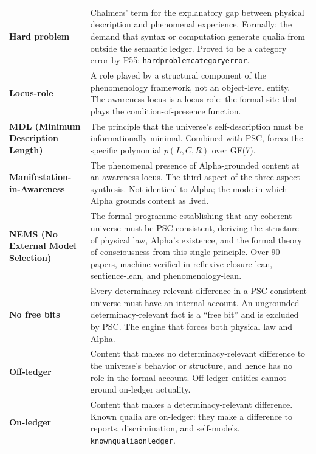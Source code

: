 \documentclass[11pt]{article}
\theoremstyle{remark}
\newcommand{\lean}[1]{%
  \penalty-100
  \begingroup\def\_{\textunderscore\allowbreak}\texttt{#1}\endgroup}
\begin{document}
\begin{longtable}{@{}>{\bfseries}p{}p{}@{}}
Hard problem &
  Chalmers' term for the explanatory gap between physical description and phenomenal
  experience. Formally: the demand that syntax or computation generate qualia from
  outside the semantic ledger. Proved to be a category error by P55:
  \lean{hard\_problem\_category\_error}. \\[4pt]

Locus-role &
  A role played by a structural component of the phenomenology framework, not an
  object-level entity. The awareness-locus is a locus-role: the formal site that plays
  the condition-of-presence function. \\[4pt]

MDL (Minimum Description Length) &
  The principle that the universe's self-description must be informationally minimal.
  Combined with PSC, forces the specific polynomial $p(L,C,R)$ over GF(7). \\[4pt]

Manifestation-in-Awareness &
  The phenomenal presence of Alpha-grounded content at an awareness-locus. The third
  aspect of the three-aspect synthesis. Not identical to Alpha; the mode in which
  Alpha grounds content as lived. \\[4pt]

NEMS (No External Model Selection) &
  The formal programme establishing that any coherent universe must be PSC-consistent,
  deriving the structure of physical law, Alpha's existence, and the formal theory of
  consciousness from this single principle. Over 90 papers, machine-verified in
  reflexive-closure-lean, sentience-lean, and phenomenology-lean. \\[4pt]

No free bits &
  Every determinacy-relevant difference in a PSC-consistent universe must have an
  internal account. An ungrounded determinacy-relevant fact is a ``free bit'' and is
  excluded by PSC. The engine that forces both physical law and Alpha. \\[4pt]

Off-ledger &
  Content that makes no determinacy-relevant difference to the universe's behavior
  or structure, and hence has no role in the formal account. Off-ledger entities
  cannot ground on-ledger actuality. \\[4pt]

On-ledger &
  Content that makes a determinacy-relevant difference. Known qualia are on-ledger:
  they make a difference to reports, discrimination, and self-models.
  \lean{known\_qualia\_on\_ledger}. \\[4pt]


\end{longtable}
\end{document}
